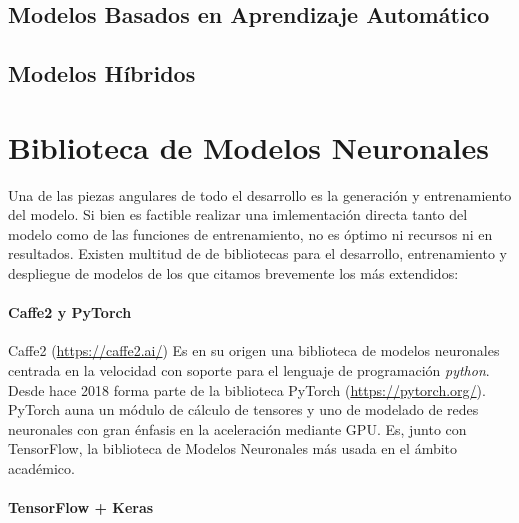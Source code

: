 

\subsection{Modelos Basados en Aprendizaje Automático}

\subsection{Modelos Híbridos}

\section{Biblioteca de Modelos Neuronales} \label{sec:req:tflite}

Una de las piezas angulares de todo el desarrollo es la generación y entrenamiento del modelo. Si bien es factible realizar una imlementación directa tanto del modelo como de las funciones de entrenamiento, no es óptimo ni recursos ni en resultados. Existen multitud de de bibliotecas para el desarrollo, entrenamiento y despliegue de modelos de los que citamos brevemente los más extendidos:

\paragraph{Caffe2 y PyTorch}

Caffe2 (\url{https://caffe2.ai/}) Es en su origen una biblioteca de modelos neuronales centrada en la velocidad con soporte para el lenguaje de programación \textit{python}. Desde hace 2018 forma parte de la biblioteca PyTorch (\url{https://pytorch.org/}). PyTorch auna un módulo de cálculo de tensores y uno de modelado de redes neuronales con gran énfasis en la aceleración mediante GPU. Es, junto con TensorFlow, la biblioteca de Modelos Neuronales más usada en el ámbito académico.

\paragraph{TensorFlow + Keras}

